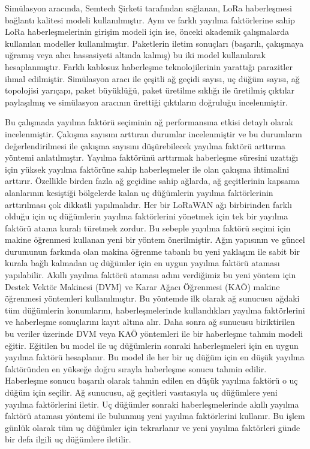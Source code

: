 Simülasyon aracında, Semtech Şirketi tarafından sağlanan, LoRa haberleşmesi bağlantı kalitesi modeli kullanılmıştır. Aynı ve farklı yayılma faktörlerine sahip LoRa haberleşmelerinin girişim modeli için ise, önceki akademik çalışmalarda kullanılan modeller kullanılmıştır. Paketlerin iletim sonuçları (başarılı, çakışmaya uğramış veya alıcı hassasiyeti altında kalmış) bu iki model kullanılarak hesaplanmıştır. Farklı kablosuz haberleşme teknolojilerinin yarattığı parazitler ihmal edilmiştir. Simülasyon aracı ile çeşitli ağ geçidi sayısı, uç düğüm sayısı, ağ topolojisi yarıçapı, paket büyüklüğü, paket üretilme sıklığı ile üretilmiş çıktılar paylaşılmış ve simülasyon aracının ürettiği çıktıların doğruluğu incelenmiştir.

Bu çalışmada yayılma faktörü seçiminin ağ performansına etkisi detaylı olarak incelenmiştir. Çakışma sayısını arttıran durumlar incelenmiştir ve bu durumların değerlendirilmesi ile çakışma sayısını düşürebilecek yayılma faktörü arttırma yöntemi anlatılmıştır. Yayılma faktörünü arttırmak haberleşme süresini uzattığı için yüksek yayılma faktörüne sahip haberleşmeler ile olan çakışma ihtimalini arttırır. Özellikle birden fazla ağ geçidine sahip ağlarda, ağ geçitlerinin kapsama alanlarının kesiştiği bölgelerde kalan uç düğümlerin yayılma faktörlerinin arttırılması çok dikkatli yapılmalıdır. Her bir LoRaWAN ağı birbirinden farklı olduğu için uç düğümlerin yayılma faktörlerini yönetmek için tek bir yayılma faktörü atama kuralı türetmek zordur. Bu sebeple yayılma faktörü seçimi için makine öğrenmesi kullanan yeni bir yöntem önerilmiştir. Ağın yapısının ve güncel durumunun farkında olan makina öğrenme tabanlı bu yeni yaklaşım ile sabit bir kurala bağlı kalmadan uç düğümler için en uygun yayılma faktörü ataması yapılabilir. Akıllı yayılma faktörü ataması adını verdiğimiz bu yeni yöntem için Destek Vektör Makinesi (DVM) ve Karar Ağacı Öğrenmesi (KAÖ) makine öğrenmesi yöntemleri kullanılmıştır. Bu yöntemde ilk olarak ağ sunucusu ağdaki tüm düğümlerin konumlarını, haberleşmelerinde kullandıkları yayılma faktörlerini ve haberleşme sonuçlarını kayıt altına alır. Daha sonra ağ sunucusu biriktirilen bu veriler üzerinde DVM veya KAÖ yöntemleri ile bir haberleşme tahmin modeli eğitir. Eğitilen bu model ile uç düğümlerin sonraki haberleşmeleri için en uygun yayılma faktörü hesaplanır. Bu model ile her bir uç düğüm için en düşük yayılma faktöründen en yükseğe doğru sırayla haberleşme sonucu tahmin edilir. Haberleşme sonucu başarılı olarak tahmin edilen en düşük yayılma faktörü o uç düğüm için seçilir. Ağ sunucusu, ağ geçitleri vasıtasıyla uç düğümlere yeni yayılma faktörlerini iletir. Uç düğümler sonraki haberleşmelerinde akıllı yayılma faktörü ataması yöntemi ile bulunmuş yeni yayılma faktörlerini kullanır. Bu işlem günlük olarak tüm uç düğümler için tekrarlanır ve yeni yayılma faktörleri günde bir defa ilgili uç düğümlere iletilir.

